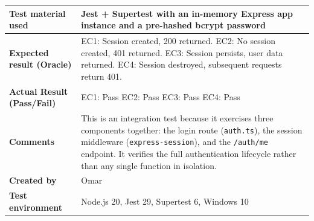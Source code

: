 \begin{table}[h!]
\begin{tabular}{|p{}|p{}|}
\textbf{Test material used} & Jest + Supertest with an in-memory Express app instance and a pre-hashed bcrypt password \\ \hline
\textbf{Expected result (Oracle)} & EC1: Session created, 200 returned. \newline EC2: No session created, 401 returned. \newline EC3: Session persists, user data returned. \newline EC4: Session destroyed, subsequent requests return 401. \\ \hline
\textbf{Actual Result (Pass/Fail)} & EC1: Pass \newline EC2: Pass \newline EC3: Pass \newline EC4: Pass \\ \hline
\textbf{Comments} & This is an integration test because it exercises three components together: the login route (\texttt{auth.ts}), the session middleware (\texttt{express-session}), and the \texttt{/auth/me} endpoint. It verifies the full authentication lifecycle rather than any single function in isolation. \\ \hline
\textbf{Created by} & Omar \\ \hline
\textbf{Test environment} & Node.js 20, Jest 29, Supertest 6, Windows 10 \\ \hline
\end{tabular}
\end{table}

